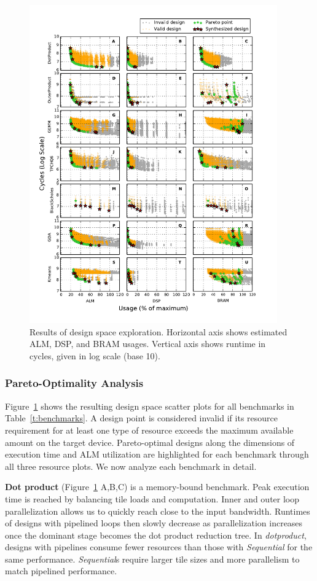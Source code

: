 \begin{figure}[!htbp]
\centering
\includegraphics[width=0.95\textwidth]{figs/tradeoff.pdf}
\caption{Results of design space exploration. Horizontal axis shows estimated ALM, DSP, and BRAM usages. Vertical axis shows runtime in cycles, given in log scale (base 10).}
\label{fig:dse}
\end{figure}

\subsubsection{Pareto-Optimality Analysis}
Figure~\ref{fig:dse} shows the resulting design space scatter plots for all benchmarks in
Table~\ref{t:benchmarks}. A design point is considered
invalid if its resource requirement for at least one type of resource exceeds the maximum
available amount on the target device. Pareto-optimal designs along the dimensions of execution time
and ALM utilization are highlighted for each benchmark through all three resource plots.
We now analyze each benchmark in detail.

\textbf{Dot product} (Figure~\ref{fig:dse} A,B,C) is a memory-bound benchmark. Peak execution
time is reached by balancing tile loads and computation. Inner and outer loop parallelization allows us to
quickly reach close to the input bandwidth. Runtimes of designs with pipelined loops then slowly decrease as parallelization
increases once the dominant stage becomes the dot product reduction tree. In \emph{dotproduct}, designs with pipelines consume fewer resources than those with \emph{Sequential} for the same performance. \emph{Sequential}s require larger tile sizes and more parallelism to match pipelined performance.

